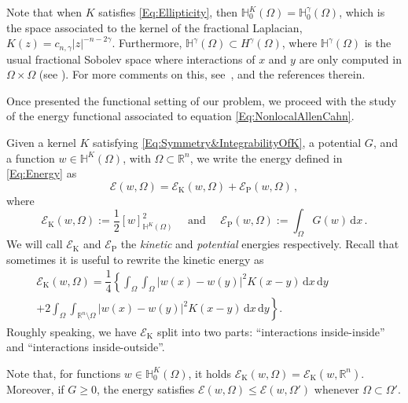 \documentclass[12pt,reqno]{amsart}
\theoremstyle{definition}
\theoremstyle{remark}
\newcommand{\con}[1]{\mathbb{#1}}
\newcommand{\R}{\con{R}} %
\renewcommand{\H}{\con{H}}
\newcommand{\ecal}{\mathcal{E}}
\newcommand{\s}{\gamma}
\renewcommand{\d}{\,\mathrm{d}} %
\numberwithin{equation}{section}
\begin{document}
	Note that when $K$ satisfies \eqref{Eq:Ellipticity}, then $\H^K_0 (\Omega) = \H^\s_0 (\Omega)$,
	which is the space associated to the kernel of the fractional Laplacian, $K(z) = c_{n,\s} |z|^{-n-2\s}$.
	Furthermore, $\H^\s(\Omega) \subset H^\s(\Omega)$, where $\H^\s(\Omega)$ is the usual fractional Sobolev space where interactions of $x$ and $y$ are only computed in $\Omega \times \Omega$ (see \cite{HitchhikerGuide}).  For more comments on this, see~\cite{CozziPassalacqua}, and the references therein.
	
	Once presented the functional setting of our problem, we proceed with the study of the energy functional associated to equation \eqref{Eq:NonlocalAllenCahn}. 
	
	
	Given a kernel $K$ satisfying \eqref{Eq:Symmetry&IntegrabilityOfK}, a potential $G$, and a function $w\in \H^K(\Omega)$, with $\Omega\subset \R^{n}$, we write the energy defined in \eqref{Eq:Energy} as
	$$
	\ecal(w, \Omega) = \ecal_\mathrm{K}(w,\Omega) + \ecal_\mathrm{P}(w,\Omega)\,,
	$$
	where
	$$
	\ecal_\mathrm{K}(w, \Omega) := \dfrac{1}{2} [w]^2_{\H^K(\Omega)} \quad \text{ and } \quad  \ecal_\mathrm{P}(w, \Omega) := \int_{\Omega} G(w) \d x
	\,.
	$$
	We will call $\ecal_\mathrm{K}$ and $\ecal_\mathrm{P}$ the \emph{kinetic} and \emph{potential} energies respectively. Recall that sometimes it is useful to rewrite the kinetic energy as
	\begin{equation}
	\label{Eq:KineticEnergyInteractions}
	\begin{split}
	\ecal_\mathrm{K}(w, \Omega) = \dfrac{1}{4} \left \{ \int_\Omega \int_\Omega |w(x) - w(y)|^2 K(x-y) \d x \d y \right. \qquad \qquad \\
	+\left. 2 \int_\Omega \int_{\R^n \setminus \Omega} |w(x) - w(y)|^2 K(x-y) \d x \d y \right \}.
	\end{split}	
	\end{equation}
	Roughly speaking, we have $\ecal_\mathrm{K}$ split into two parts: ``interactions inside-inside'' and ``interactions inside-outside''.
	
	Note that, for functions $w\in \H^K_0(\Omega)$, it holds $\ecal_\mathrm{K}(w,\Omega) = \ecal_\mathrm{K}(w,\R^n)$. Moreover, if $G\geq 0$, the energy satisfies $\ecal(w, \Omega) \leq \ecal(w, \Omega')$  whenever $ \Omega \subset \Omega'$.
	
\end{document}
